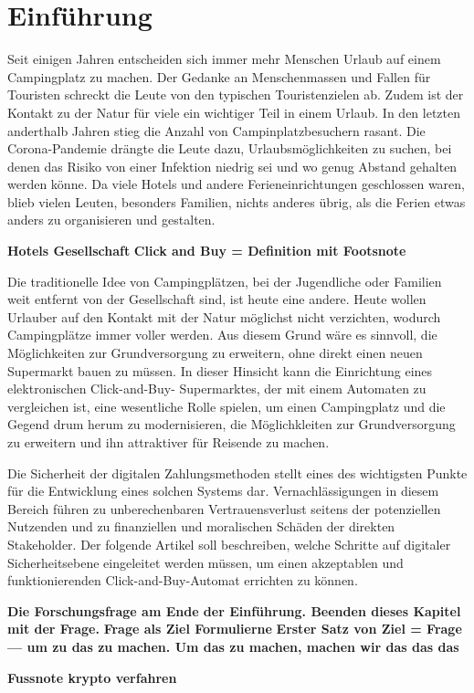 \section{Einführung}


Seit einigen Jahren entscheiden sich immer mehr Menschen Urlaub auf einem Campingplatz 
zu machen. Der Gedanke an Menschenmassen und Fallen für Touristen schreckt die Leute von
den typischen Touristenzielen ab. Zudem ist der Kontakt zu der Natur für viele ein wichtiger
Teil in einem Urlaub. In den letzten anderthalb Jahren stieg die Anzahl von Campinplatzbesuchern
rasant. Die Corona-Pandemie drängte die Leute dazu, Urlaubsmöglichkeiten zu suchen, bei denen
das Risiko von einer Infektion niedrig sei und wo genug Abstand gehalten werden könne. Da viele 
Hotels und andere Ferieneinrichtungen geschlossen waren, blieb vielen Leuten, besonders Familien,
nichts anderes übrig, als die Ferien etwas anders zu organisieren und gestalten.


\textbf{Hotels Gesellschaft}
\textbf{Click and Buy = Definition mit Footsnote}


Die traditionelle Idee von Campingplätzen, bei der Jugendliche oder Familien weit entfernt von der 
Gesellschaft sind, ist heute eine andere. Heute wollen Urlauber auf den Kontakt mit der Natur
möglichst nicht verzichten, wodurch Campingplätze immer voller werden. Aus diesem Grund wäre es
sinnvoll, die Möglichkeiten zur Grundversorgung zu erweitern, ohne direkt einen neuen Supermarkt
bauen zu müssen. In dieser Hinsicht kann die Einrichtung eines elektronischen Click-and-Buy-
Supermarktes, der mit einem Automaten zu vergleichen ist, eine wesentliche Rolle spielen, um 
einen Campingplatz und die Gegend drum herum zu modernisieren, die Möglichkleiten zur Grundversorgung 
zu erweitern und ihn attraktiver für Reisende zu machen.

Die Sicherheit der digitalen Zahlungsmethoden stellt eines des wichtigsten Punkte für die Entwicklung
eines solchen Systems dar. Vernachlässigungen in diesem Bereich führen zu unberechenbaren Vertrauensverlust 
seitens der potenziellen Nutzenden und zu finanziellen und moralischen Schäden der direkten
Stakeholder. Der folgende Artikel soll beschreiben, welche Schritte auf digitaler Sicherheitsebene 
eingeleitet werden müssen, um einen akzeptablen und funktionierenden Click-and-Buy-Automat errichten 
zu können. 

\textbf{Die Forschungsfrage am Ende der Einführung. Beenden dieses Kapitel mit der Frage.} 
\textbf{Frage als Ziel Formulierne}
\textbf{Erster Satz von Ziel = Frage --- um zu das zu machen. Um das zu machen, machen wir das das das}

\textbf{Fussnote krypto verfahren}

